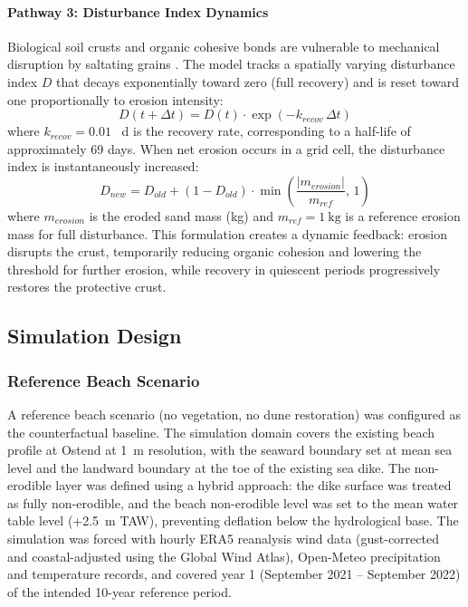 \documentclass[authoryear,preprint,review,12pt]{elsarticle}
\begin{document}
\paragraph{Pathway 3: Disturbance Index Dynamics}

Biological soil crusts and organic cohesive bonds are vulnerable to mechanical disruption by saltating grains \citep{belnap1998vulnerability}. The model tracks a spatially varying disturbance index $D$ that decays exponentially toward zero (full recovery) and is reset toward one proportionally to erosion intensity:
\begin{equation}
D(t + \Delta t) = D(t) \cdot \exp\left(-k_{recov}\, \Delta t\right)
\label{eq:disturbance_decay}
\end{equation}
where $k_{recov} = 0.01$ \si{\per\day} is the recovery rate, corresponding to a half-life of approximately 69 days. When net erosion occurs in a grid cell, the disturbance index is instantaneously increased:
\begin{equation}
D_{new} = D_{old} + \left(1 - D_{old}\right) \cdot \min\left(\frac{|m_{erosion}|}{m_{ref}},\, 1\right)
\label{eq:disturbance_reset}
\end{equation}
where $m_{erosion}$ is the eroded sand mass (\si{\kilo\gram}) and $m_{ref} = \SI{1}{\kilo\gram}$ is a reference erosion mass for full disturbance. This formulation creates a dynamic feedback: erosion disrupts the crust, temporarily reducing organic cohesion and lowering the threshold for further erosion, while recovery in quiescent periods progressively restores the protective crust.


\subsection{Simulation Design}

\subsubsection{Reference Beach Scenario}

A reference beach scenario (no vegetation, no dune restoration) was configured as the counterfactual baseline. The simulation domain covers the existing beach profile at Ostend at \SI{1}{\metre} resolution, with the seaward boundary set at mean sea level and the landward boundary at the toe of the existing sea dike. The non-erodible layer was defined using a hybrid approach: the dike surface was treated as fully non-erodible, and the beach non-erodible level was set to the mean water table level (+\SI{2.5}{\metre} TAW), preventing deflation below the hydrological base. The simulation was forced with hourly ERA5 reanalysis wind data (gust-corrected and coastal-adjusted using the Global Wind Atlas), Open-Meteo precipitation and temperature records, and covered year 1 (September 2021 -- September 2022) of the intended 10-year reference period.
\end{document}
